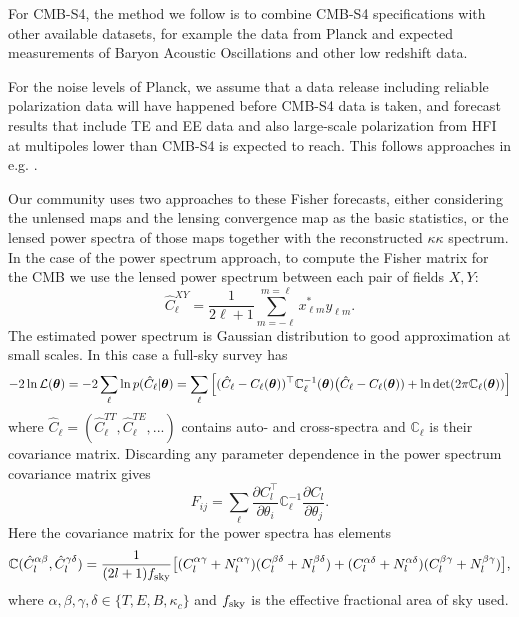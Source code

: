 For CMB-S4, the method we follow is to combine CMB-S4 specifications with other available datasets, for example the data from Planck and expected measurements of Baryon Acoustic Oscillations and other low redshift data. 

For the noise levels of Planck, we assume that a data release including reliable polarization data will have happened before CMB-S4 data is taken, and forecast results that include TE and EE data and also large-scale polarization from HFI at multipoles lower than CMB-S4 is expected to reach. This follows approaches in e.g. \cite{allison/etal:2015}.

Our community uses two approaches to these Fisher forecasts, either considering the unlensed maps and the lensing convergence map as the basic statistics, or the lensed power spectra of those maps together with the reconstructed $\kappa \kappa$ spectrum. In the case of the power spectrum approach, to compute the Fisher matrix for the CMB we use the lensed power spectrum between each pair of fields $X, Y$:
%
\begin{equation}
\label{eqEstimator}
\hat{C}^{XY}_\ell = \frac{1}{2\ell+1}\sum_{m=-\ell}^{m=\ell} x^{*}_{\ell m} y_{\ell m}.
\end{equation}
%
The estimated power spectrum is Gaussian distribution to good approximation at small scales. In this case a full-sky survey has
%
\begin{equation}
-2\ln\mathcal{L}(\boldsymbol{\theta}) = -2\sum_\ell \ln p( \hat{C}_\ell | \boldsymbol{\theta}) \\
=  \sum_\ell  \Big[ (\hat{C}_\ell - C_\ell(\boldsymbol{\theta}) )^\top  \mathbb{C}^{-1}_\ell(\boldsymbol{\theta}) \big(\hat{C}_\ell - C_\ell(\boldsymbol{\theta})) + \ln \det(2 \pi \mathbb{C}_\ell(\boldsymbol{\theta})) \Big]
\end{equation}
%
where $ \hat{C}_\ell = (\hat{C}_\ell^{TT}, \hat{C}_\ell^{TE}, ...) $ contains auto- and cross-spectra and $\mathbb{C}_\ell$ is their covariance matrix. Discarding any parameter dependence in the power spectrum covariance matrix gives
%
\begin{equation}
F_{ij} = \sum_\ell \frac{\partial C^\top_l}{\partial \theta_i} \mathbb{C}^{-1}_\ell \frac{\partial C_l}{\partial \theta_j}.
\end{equation}
%
Here the covariance matrix for the power spectra has elements
%
\begin{equation}
\mathbb{C}(\hat{C}_l^{\alpha \beta}, \hat{C}_l^{\gamma \delta}) = \frac{1}{(2l+1)f_{\rm sky}} \big[ (C_l^{\alpha \gamma} + N_l^{\alpha \gamma}) (C_l^{\beta \delta} + N_l^{\beta \delta})  \\
+ (C_l^{\alpha \delta} + N_l^{\alpha \delta}) (C_l^{\beta \gamma} + N_l^{\beta \gamma}) \big],
\end{equation}
%
where $\alpha, \beta, \gamma, \delta \in \{T, E, B, \kappa_c\}$ and $f_{\rm sky}$ is the effective fractional area of sky used. 

